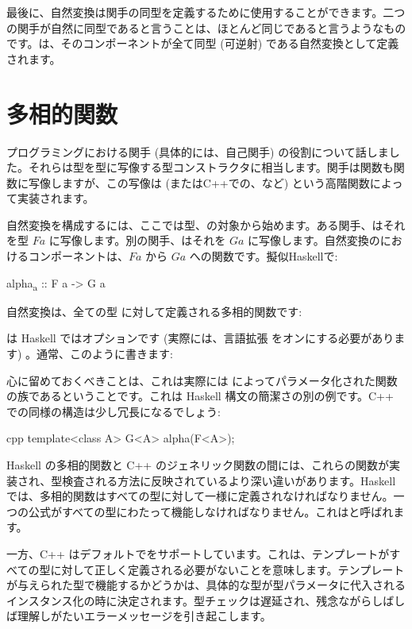 最後に、自然変換は関手の同型を定義するために使用することができます。二つの関手が自然に同型であると言うことは、ほとんど同じであると言うようなものです。は、そのコンポーネントが全て同型 (可逆射) である自然変換として定義されます。

\section{多相的関数}

プログラミングにおける関手 (具体的には、自己関手) の役割について話しました。それらは型を型に写像する型コンストラクタに相当します。関手は関数も関数に写像しますが、この写像は (またはC++での、など) という高階関数によって実装されます。

自然変換を構成するには、ここでは型、の対象から始めます。ある関手、はそれを型 $F a$ に写像します。別の関手、はそれを $G a$ に写像します。自然変換のにおけるコンポーネントは、$F a$ から $G a$ への関数です。擬似Haskellで: 

\begin{snipv}
alpha\textsubscript{a} :: F a -> G a
\end{snipv}
自然変換は、全ての型  に対して定義される多相的関数です: 

 は Haskell ではオプションです (実際には、言語拡張  をオンにする必要があります) 。通常、このように書きます: 

心に留めておくべきことは、これは実際には  によってパラメータ化された関数の族であるということです。これは Haskell 構文の簡潔さの別の例です。C++ での同様の構造は少し冗長になるでしょう: 

\begin{snip}{cpp}
template<class A> G<A> alpha(F<A>);
\end{snip}
Haskell の多相的関数と C++ のジェネリック関数の間には、これらの関数が実装され、型検査される方法に反映されているより深い違いがあります。Haskell では、多相的関数はすべての型に対して一様に定義されなければなりません。一つの公式がすべての型にわたって機能しなければなりません。これはと呼ばれます。

一方、C++ はデフォルトでをサポートしています。これは、テンプレートがすべての型に対して正しく定義される必要がないことを意味します。テンプレートが与えられた型で機能するかどうかは、具体的な型が型パラメータに代入されるインスタンス化の時に決定されます。型チェックは遅延され、残念ながらしばしば理解しがたいエラーメッセージを引き起こします。

